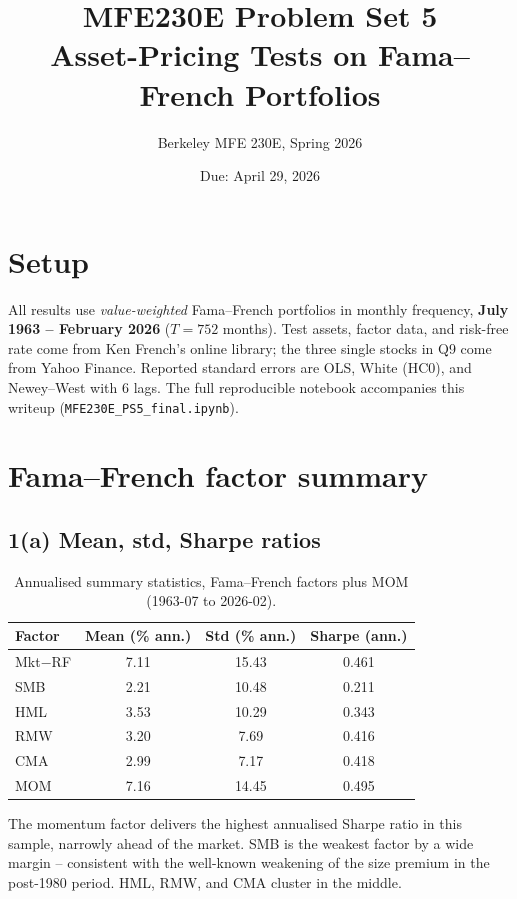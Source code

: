 \documentclass[11pt,letterpaper]{article}
\title{\textbf{MFE230E Problem Set 5}\\[2pt]
\large Asset-Pricing Tests on Fama--French Portfolios}
\author{Berkeley MFE 230E, Spring 2026}
\date{Due: April 29, 2026}
\begin{document}
\maketitle

\section*{Setup}

All results use \emph{value-weighted} Fama--French portfolios in monthly frequency,
\textbf{July 1963 -- February 2026} (\(T=752\) months). Test assets, factor data, and
risk-free rate come from Ken French's online library; the three single stocks in Q9 come
from Yahoo Finance. Reported standard errors are OLS, White (HC0), and Newey--West with
6 lags. The full reproducible notebook accompanies this writeup
(\texttt{MFE230E\_PS5\_final.ipynb}).

\section{Fama--French factor summary}

\subsection*{1(a) Mean, std, Sharpe ratios}

\begin{table}[h]
\centering
\caption{Annualised summary statistics, Fama--French factors plus MOM (1963-07 to 2026-02).}
\begin{tabular}{lccc}
\toprule
Factor & Mean (\% ann.) & Std (\% ann.) & Sharpe (ann.) \\
\midrule
Mkt$-$RF & 7.11 & 15.43 & 0.461 \\
SMB      & 2.21 & 10.48 & 0.211 \\
HML      & 3.53 & 10.29 & 0.343 \\
RMW      & 3.20 &  7.69 & 0.416 \\
CMA      & 2.99 &  7.17 & 0.418 \\
MOM      & 7.16 & 14.45 & 0.495 \\
\bottomrule
\end{tabular}
\end{table}

The momentum factor delivers the highest annualised Sharpe ratio in this sample, narrowly
ahead of the market. SMB is the weakest factor by a wide margin -- consistent with the
well-known weakening of the size premium in the post-1980 period. HML, RMW, and CMA
cluster in the middle.
\end{document}
